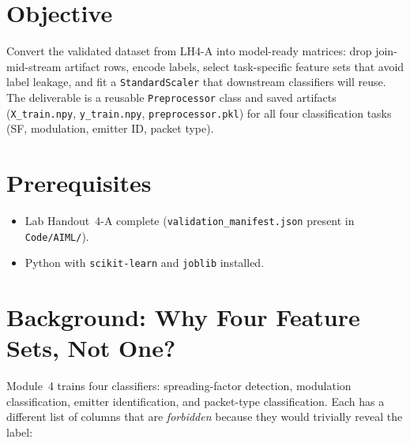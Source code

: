 \documentclass[11pt,letterpaper]{article}
\begin{document}

\section{Objective}
Convert the validated dataset from LH4-A into model-ready matrices: drop join-mid-stream artifact rows, encode labels, select task-specific feature sets that avoid label leakage, and fit a \texttt{StandardScaler} that downstream classifiers will reuse. The deliverable is a reusable \texttt{Preprocessor} class and saved artifacts (\texttt{X\_train.npy}, \texttt{y\_train.npy}, \texttt{preprocessor.pkl}) for all four classification tasks (SF, modulation, emitter ID, packet type).

\section{Prerequisites}
\begin{itemize}[leftmargin=2em]
	\item Lab Handout~4-A complete (\texttt{validation\_manifest.json} present in \texttt{Code/AIML/}).
	\item Python with \texttt{scikit-learn} and \texttt{joblib} installed.
\end{itemize}

\section{Background: Why Four Feature Sets, Not One?}
Module~4 trains four classifiers: spreading-factor detection, modulation classification, emitter identification, and packet-type classification. Each has a different list of columns that are \emph{forbidden} because they would trivially reveal the label:
\end{document}
